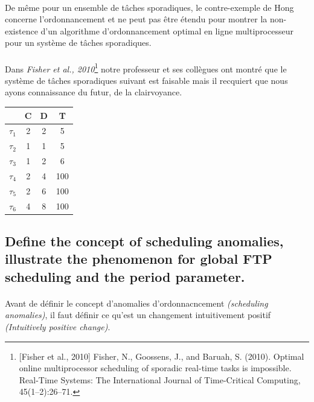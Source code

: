   \paragraph{}
  De même pour un ensemble de tâches sporadiques, le contre-exemple de Hong concerne 
  l'ordonnancement et ne peut pas être étendu pour montrer la non-existence d'un 
  algorithme d'ordonnancement optimal en ligne multiprocesseur pour un système de tâches 
  sporadiques.

  \paragraph{} Dans \textit{Fisher et al., 2010}\footnote{[Fisher et al., 2010] Fisher, 
  N., Goossens, J., and Baruah, S. (2010). Optimal online multiprocessor scheduling of 
  sporadic real-time tasks is impossible. Real-Time Systems: The International Journal 
  of Time-Critical Computing, 45(1–2):26–71.} notre professeur et ses collègues ont 
  montré que le système de tâches sporadiques suivant est faisable mais il recquiert que 
  nous ayons connaissance du futur, de la clairvoyance.
  \begin{center}
    \begin{tabular}{| l | c | c | c |}
      \hline
                   & C  & D  & T \\
      \hline
       $\tau_{1}$  & 2  & 2  & 5 \\
      \hline
       $\tau_{2}$  & 1  & 1  & 5 \\
      \hline
       $\tau_{3}$  & 1  & 2 & 6  \\
      \hline
       $\tau_{4}$  & 2 & 4 & 100 \\
      \hline     
       $\tau_{5}$  & 2 & 6 & 100 \\
      \hline     
       $\tau_{6}$  & 4 & 8 & 100 \\
      \hline
  \end{tabular}
  \end{center}

\subsection{Define the concept of scheduling anomalies, illustrate the phenomenon for global FTP scheduling and the period parameter.}

  \paragraph{}
  Avant de définir le concept d'anomalies d'ordonnacncement \textit{(scheduling 
  anomalies)}, il faut définir ce qu'est un changement intuitivement positif 
  \textit{(Intuitively positive change)}.

